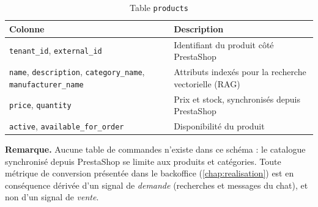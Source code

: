 \begin{table}[h]
\centering
\caption{Table \texttt{products}}
\begin{tabular}{@{}p{4cm}p{11cm}@{}}
\toprule
\textbf{Colonne} & \textbf{Description} \\
\midrule
\texttt{tenant\_id}, \texttt{external\_id} & Identifiant du produit côté PrestaShop \\
\texttt{name}, \texttt{description}, \texttt{category\_name}, \texttt{manufacturer\_name} & Attributs indexés pour la recherche vectorielle (RAG) \\
\texttt{price}, \texttt{quantity} & Prix et stock, synchronisés depuis PrestaShop \\
\texttt{active}, \texttt{available\_for\_order} & Disponibilité du produit \\
\bottomrule
\end{tabular}
\end{table}

\bigskip
\noindent\textbf{Remarque.} Aucune table de commandes n'existe dans ce schéma : le catalogue synchronisé depuis PrestaShop se limite aux produits et catégories. Toute métrique de conversion présentée dans le backoffice (\cref{chap:realisation}) est en conséquence dérivée d'un signal de \emph{demande} (recherches et messages du chat), et non d'un signal de \emph{vente}.
